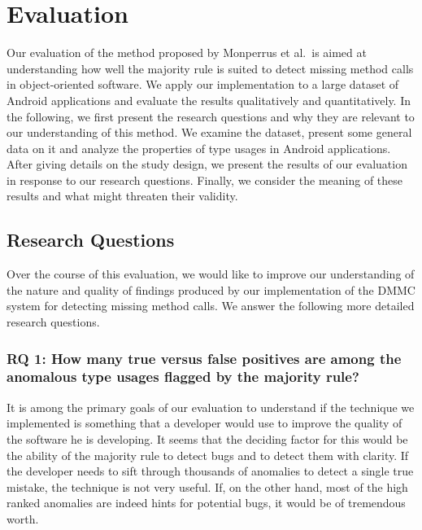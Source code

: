 \chapter{Evaluation}\label{ch:eval}

Our evaluation of the method proposed by Monperrus et al.\ is aimed at understanding how well the majority rule is suited to detect missing method calls in object-oriented software.
We apply our implementation to a large dataset of Android applications and evaluate the results qualitatively and quantitatively.
In the following, we first present the research questions and why they are relevant to our understanding of this method.
We examine the dataset, present some general data on it and analyze the properties of type usages in Android applications.
After giving details on the study design, we present the results of our evaluation in response to our research questions.
Finally, we consider the meaning of these results and what might threaten their validity.

\section{Research Questions}\label{sc:rq}

Over the course of this evaluation, we would like to improve our understanding of the nature and quality of findings produced by our implementation of the $\text{DMMC}$ system for detecting missing method calls.
We answer the following more detailed research questions.

\subsection*{RQ 1: How many true versus false positives are among the anomalous type usages flagged by the majority rule?}

It is among the primary goals of our evaluation to understand if the technique we implemented is something that a developer would use to improve the quality of the software he is developing.
It seems that the deciding factor for this would be the ability of the majority rule to detect bugs and to detect them with clarity.
If the developer needs to sift through thousands of anomalies to detect a single true mistake, the technique is not very useful.
If, on the other hand, most of the high ranked anomalies are indeed hints for potential bugs, it would be of tremendous worth.

